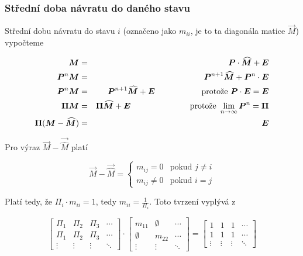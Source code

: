 \subsubsection{Střední doba návratu do daného stavu}
Střední dobu návratu do stavu $i$ (označeno jako $m_{ii}$, je to ta diagonála matice $\vec{M}$) vypočteme

\begin{eqnarray*}
\vec{M} & = & \vec{P}\cdot\vec{\widehat{M}}+\vec{E}\\
\vec{P}^n\vec{M} &=& \vec{P}^{n+1}\vec{\widehat{M}}+\vec{P}^n\cdot\vec{E}\\
\vec{P}^n\vec{M} &=& \vec{P}^{n+1}\vec{\widehat{M}}+\vec{E}\hspace*{2cm} \text{protože }\vec{P}\cdot\vec{E}=\vec{E}\\
\vec{\Pi}\vec{M} &=& \vec{\Pi}\vec{\widehat{M}}+\vec{E}\hspace*{2.55cm} \text{protože } \lim_{n\to\infty}\vec{P}^n=\vec{\Pi}\\
\vec{\Pi}(\vec{M}-\vec{\widehat{M}}) & = & \vec{E}
\end{eqnarray*}

Pro výraz $\vec{M}-\vec{\widehat{M}}$ platí

\[ \vec{M}-\vec{\widehat{M}} =
\begin{cases}
m_{ij}=0 & \text{pokud } j\neq i\\
m_{ij}\neq 0 & \text{pokud } i = j
\end{cases}
 \]

Platí tedy, že $\Pi_i\cdot m_{ii}=1$, tedy $m_{ii}=\frac{1}{\Pi_i}$. Toto tvrzení vyplývá z

\[
\begin{bmatrix}
\Pi_1 & \Pi_2 & \Pi_3 & \cdots \\
\Pi_1 & \Pi_2 & \Pi_3 & \cdots \\
\vdots & \vdots & \vdots & \ddots
\end{bmatrix} \cdot
\begin{bmatrix}
m_{11} & \emptyset & \cdots \\
\emptyset & m_{22} & \cdots \\
\vdots & \vdots & \ddots
\end{bmatrix} =
\begin{bmatrix}
1 & 1 & 1 & \cdots \\
1 & 1 & 1 & \cdots \\
\vdots & \vdots & \vdots & \ddots
\end{bmatrix}
\]
